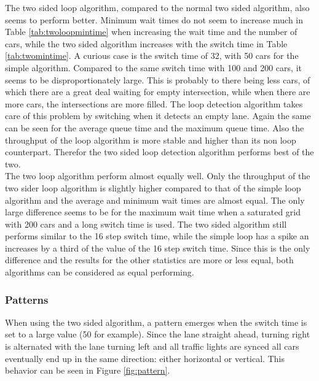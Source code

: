 \documentclass[a4paper,11pt]{article}
\begin{document}
\noindent The two sided loop algorithm, compared to the normal two sided algorithm, also seems to perform better.
Minimum wait times do not seem to increase much in Table \ref{tab:twoloopmintime} when increasing the wait time and the number of cars,
while the two sided algorithm increases with the switch time in Table \ref{tab:twomintime}. A curious case is the switch time of 32, with 50 cars for the simple algorithm.
Compared to the same switch time with 100 and 200 cars, it seems to be disproportionately large.
This is probably to there being less cars, of which there are a great deal waiting for empty intersection, while when there are more cars, the intersections are more filled.
The loop detection algorithm takes care of this problem by switching when it detects an empty lane.
Again the same can be seen for the average queue time and the maximum queue time.
Also the throughput of the loop algorithm is more stable and higher than its non loop counterpart.
Therefor the two sided loop detection algorithm performs best of the two.\\

\noindent The two loop algorithm perform almost equally well.
Only the throughput of the two sider loop algorithm is slightly higher compared to that of the simple loop algorithm
and the average and minimum wait times are almost equal.
The only large difference seems to be for the maximum wait time when a saturated grid with 200 cars and a long switch time is used.
The two sided algorithm still performs similar to the 16 step switch time, while the simple loop has a spike an increases by a third 
of the value of the 16 step switch time. Since this is the only difference and the results for the other statistics are more or less equal,
both algorithms can be considered as equal performing.

\subsubsection*{Patterns}
When using the two sided algorithm, a pattern emerges when the switch time is set to a large value (50 for example).
Since the lane straight ahead, turning right is alternated with the lane turning left and all traffic lights are
synced all cars eventually end up in the same direction: either horizontal or vertical.
This behavior can be seen in Figure \ref{fig:pattern}.
\end{document}
